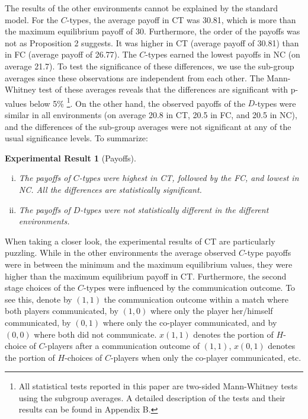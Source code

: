 \documentclass[12pt]{article}
\theoremstyle{break}
\newtheorem{result}{Experimental Result}\theoremstyle{break}
\begin{document}
The results of the other environments cannot be explained by the standard model. For the $C$-types, the average payoff in CT was 30.81, which is more than the maximum equilibrium payoff of 30. Furthermore, the order of the payoffs was not as Proposition 2 suggests. It was higher in CT (average payoff of 30.81) than in FC (average payoff of 26.77). The $C$-types earned the lowest payoffs in NC (on average 21.7). To test the significance of these differences, we use the sub-group averages since these observations are independent from each other. The Mann-Whitney test of these averages reveals that the differences are significant with p-values below 5\% \footnote{%
All statistical tests reported in this paper are two-sided Mann-Whitney tests using the subgroup averages. A detailed description of the tests and their results can be found in Appendix B.}. 
On the other hand, the observed payoffs of the $D$-types were similar in all environments (on average 20.8 in CT, 20.5 in FC, and 20.5 in NC), and the differences of the sub-group averages were not significant at any of the usual significance levels. To summarize:

\begin{result}[Payoffs]
	\begin{enumerate}[i)]\setlength\itemsep{0em}
		\item The payoffs of $C$-types were highest in CT, followed by the FC, and lowest in NC. All the differences are statistically significant.
		\item The payoffs of $D$-types were not statistically different in the different environments.
	\end{enumerate}
\end{result}

When taking a closer look, the experimental results of CT are particularly puzzling. While in the other environments the average observed $C$-type payoffs were in between the minimum and the maximum equilibrium values, they were higher than the maximum equilibrium payoff in CT. Furthermore, the second stage choices of the $C$-types were influenced by the communication outcome. To see this, denote by $(1,1)$ the communication outcome within a match where both players communicated, by $(1,0)$ where only the player her/himself communicated, by $(0,1)$ where only the co-player communicated, and by $(0,0)$ where both did not communicate. $x(1,1)$ denotes the portion of $H$-choice of $C$-players after a communication outcome of $(1,1)$, $x(0,1)$ denotes the portion of $H$-choices of $C$-players when only the co-player communicated, etc. 
\end{document}

